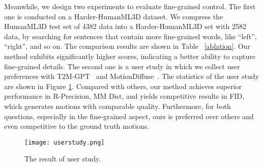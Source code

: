 \documentclass[10pt,twocolumn,letterpaper]{article}
\begin{document}
Meanwhile, we design two experiments to evaluate fine-grained control. The first one is conducted on a Harder-HumanML3D dataset. We compress the HumanML3D test set of 4382 data into a Harder-HumanML3D set with 2582 data, by searching for sentences that contain more fine-grained words, like  ``left'',  ``right'', and so on. The comparison results are shown in Table ~\ref{ablation}. Our method exhibits significantly higher scores, indicating a better ability to capture fine-grained details. The second one is a user study in which we collect user preferences with T2M-GPT~\cite{zhang2023t2m} and MotionDiffuse~\cite{zhang2022motiondiffuse}. The statistics of the user study are shown in Figure \ref{user_study}.  Compared with others, our method achieves superior performance in R-Precision, MM Dist, and yields competitive results in FID, which generates motions with comparable quality. Furthermore, for both questions, especially in the fine-grained aspect, ours is preferred over others and even competitive to the ground truth motions.



\begin{figure}[t]
    \centering
     \texttt{[image: userstudy.png]}
    \caption{The result of user study.}
    \label{user_study}
\end{figure}
\end{document}
